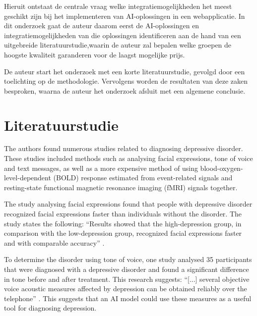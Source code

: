 \documentclass[dutch]{hogent-article}
\begin{document}
  Hieruit ontstaat de centrale vraag welke integratiemogelijkheden het meest geschikt zijn bij het implementeren van AI-oplossingen in een webapplicatie. In dit onderzoek gaat de auteur daarom eerst de AI-oplossingen en integratiemogelijkheden van die oplossingen identificeren aan de hand van een uitgebreide literatuurstudie,\linebreak waarin de auteur zal bepalen welke groepen de hoogste kwaliteit garanderen voor de laagst mogelijke prijs.
  
  De auteur start het onderzoek met een korte literatuurstudie, gevolgd door een toelichting op de methodologie. Vervolgens worden de resultaten van deze zaken besproken, waarna de auteur het onderzoek afsluit met een algemene conclusie.
  

\section{Literatuurstudie}%
\label{sec:literature review}


The authors found numerous studies related to diagnosing depressive disorder. These studies included methods such as analysing facial expressions, tone of voice and text messages, as well as a more expensive method of using blood-oxygen-level-dependent (BOLD) response estimated from event-related signals and resting-state functional magnetic resonance imaging (fMRI) signals together.

The study analysing facial expressions found that people with depressive disorder recognized facial expressions faster than individuals without the disorder. The study states the following: “Results showed that the high-depression group, in comparison with the low-depression group, recognized facial expressions faster and with comparable accuracy” \autocite[7]{Wu2012}.

To determine the disorder using tone of voice, one study analysed 35 participants that were diagnosed with a depressive disorder and found a significant difference in tone before and after treatment. This research suggests: “[...] several objective voice acoustic measures affected by depression can be obtained reliably over the telephone” \parencite[3]{Mundt2007}. This suggests that an AI model could use these measures as a useful tool for diagnosing depression.
\end{document}
